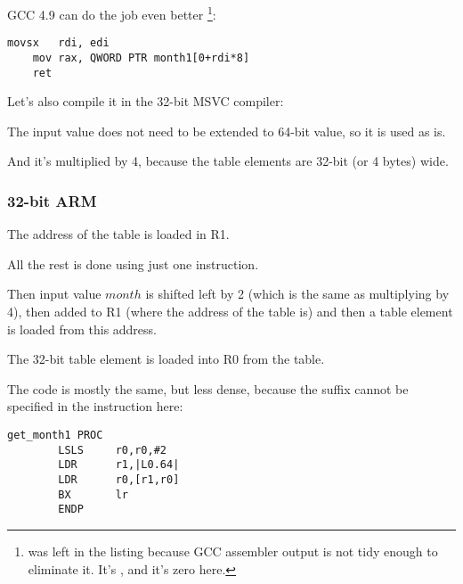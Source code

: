 \Optimizing GCC 4.9 can do the job even better
\footnote{ was left in the listing because GCC assembler output is not tidy enough to eliminate it.
It's , and it's zero here.}:

\begin{lstlisting}[caption=\Optimizing GCC 4.9 x64]
	movsx	rdi, edi
	mov	rax, QWORD PTR month1[0+rdi*8]
	ret
\end{lstlisting}


Let's also compile it in the 32-bit MSVC compiler:



The input value does not need to be extended to 64-bit value, so it is used as is.

And it's multiplied by 4, because the table elements are 32-bit (or 4 bytes) wide.

\subsubsection{32-bit ARM}





The address of the table is loaded in R1.

All the rest is done using just one \LDR instruction.

Then input value $month$ is shifted left by 2 (which is the same as multiplying by 4), then added
to R1 (where the address of the table is) and then a table element is loaded from this address.

The 32-bit table element is loaded into R0 from the table.


The code is mostly the same, but less dense, because the \LSL suffix cannot be specified in the \LDR instruction here:

\begin{lstlisting}
get_month1 PROC
        LSLS     r0,r0,#2
        LDR      r1,|L0.64|
        LDR      r0,[r1,r0]
        BX       lr
        ENDP
\end{lstlisting}

